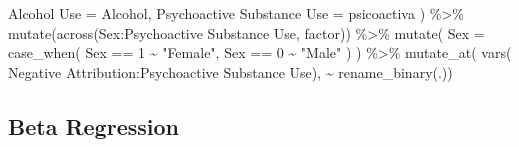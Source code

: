 \documentclass[
  letterpaper,
  DIV=11,
  numbers=noendperiod]{scrartcl}
\newenvironment{Shaded}{\begin{snugshade}}{\end{snugshade}}
\newcommand{\AttributeTok}[1]{\textcolor[rgb]{0.40,0.45,0.13}{#1}}
\newcommand{\DecValTok}[1]{\textcolor[rgb]{0.68,0.00,0.00}{#1}}
\newcommand{\FunctionTok}[1]{\textcolor[rgb]{0.28,0.35,0.67}{#1}}
\newcommand{\NormalTok}[1]{\textcolor[rgb]{0.00,0.23,0.31}{#1}}
\newcommand{\OtherTok}[1]{\textcolor[rgb]{0.00,0.23,0.31}{#1}}
\newcommand{\SpecialCharTok}[1]{\textcolor[rgb]{0.37,0.37,0.37}{#1}}
\newcommand{\StringTok}[1]{\textcolor[rgb]{0.13,0.47,0.30}{#1}}
\begin{document}
\begin{Shaded}
\begin{Highlighting}[]
    \StringTok{\textasciigrave{}}\AttributeTok{Alcohol Use}\StringTok{\textasciigrave{}} \OtherTok{=}\NormalTok{ Alcohol, }
    \StringTok{\textasciigrave{}}\AttributeTok{Psychoactive Substance Use}\StringTok{\textasciigrave{}} \OtherTok{=}\NormalTok{ psicoactiva}
\NormalTok{    ) }\SpecialCharTok{\%\textgreater{}\%}
  \FunctionTok{mutate}\NormalTok{(}\FunctionTok{across}\NormalTok{(Sex}\SpecialCharTok{:}\StringTok{\textasciigrave{}}\AttributeTok{Psychoactive Substance Use}\StringTok{\textasciigrave{}}\NormalTok{, factor)) }\SpecialCharTok{\%\textgreater{}\%} 
  \FunctionTok{mutate}\NormalTok{(}
    \AttributeTok{Sex =} \FunctionTok{case\_when}\NormalTok{(}
\NormalTok{      Sex }\SpecialCharTok{==} \DecValTok{1} \SpecialCharTok{\textasciitilde{}} \StringTok{"Female"}\NormalTok{,}
\NormalTok{      Sex }\SpecialCharTok{==} \DecValTok{0} \SpecialCharTok{\textasciitilde{}} \StringTok{"Male"}
\NormalTok{    )}
\NormalTok{  ) }\SpecialCharTok{\%\textgreater{}\%}
  \FunctionTok{mutate\_at}\NormalTok{(}
    \FunctionTok{vars}\NormalTok{(}
      \StringTok{\textasciigrave{}}\AttributeTok{Negative Attribution}\StringTok{\textasciigrave{}}\SpecialCharTok{:}\StringTok{\textasciigrave{}}\AttributeTok{Psychoactive Substance Use}\StringTok{\textasciigrave{}}\NormalTok{),}
      \SpecialCharTok{\textasciitilde{}} \FunctionTok{rename\_binary}\NormalTok{(.)) }
\end{Highlighting}
\end{Shaded}

\subsection{Beta Regression}\label{beta-regression}
\end{document}
